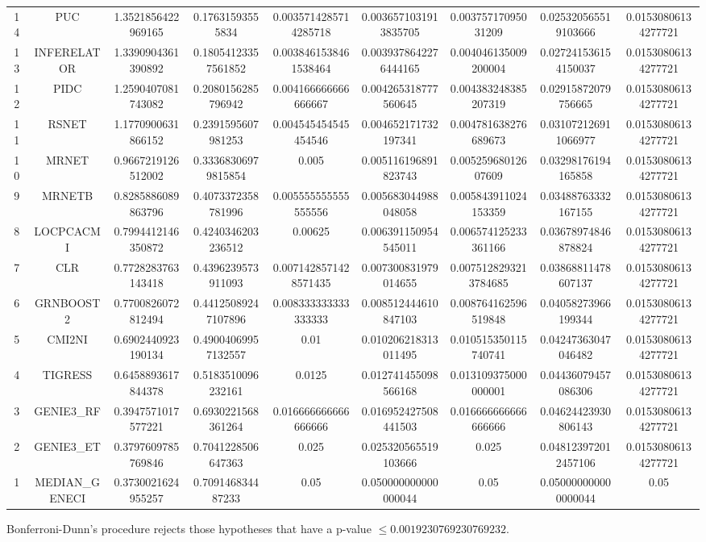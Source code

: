 \documentclass[a4paper,10pt]{article}
\begin{document}
\begin{landscape}
\begin{table}[!htp]
\begin{tabular}{ccccccccc}
14&PUC&1.3521856422969165&0.17631593555834&0.0035714285714285718&0.0036571031913835705&0.00375717095031209&0.025320565519103666&0.01530806134277721\\
13&INFERELATOR&1.3390904361390892&0.18054123357561852&0.0038461538461538464&0.0039378642276444165&0.004046135009200004&0.027241536154150037&0.01530806134277721\\
12&PIDC&1.2590407081743082&0.2080156285796942&0.004166666666666667&0.004265318777560645&0.004383248385207319&0.02915872079756665&0.01530806134277721\\
11&RSNET&1.1770900631866152&0.2391595607981253&0.004545454545454546&0.004652171732197341&0.004781638276689673&0.031072126911066977&0.01530806134277721\\
10&MRNET&0.9667219126512002&0.33368306979815854&0.005&0.005116196891823743&0.00525968012607609&0.03298176194165858&0.01530806134277721\\
9&MRNETB&0.8285886089863796&0.4073372358781996&0.005555555555555556&0.005683044988048058&0.005843911024153359&0.03488763332167155&0.01530806134277721\\
8&LOCPCACMI&0.7994412146350872&0.4240346203236512&0.00625&0.006391150954545011&0.006574125233361166&0.03678974846878824&0.01530806134277721\\
7&CLR&0.7728283763143418&0.4396239573911093&0.0071428571428571435&0.007300831979014655&0.0075128293213784685&0.03868811478607137&0.01530806134277721\\
6&GRNBOOST2&0.7700826072812494&0.44125089247107896&0.008333333333333333&0.008512444610847103&0.008764162596519848&0.04058273966199344&0.01530806134277721\\
5&CMI2NI&0.6902440923190134&0.49004069957132557&0.01&0.010206218313011495&0.010515350115740741&0.04247363047046482&0.01530806134277721\\
4&TIGRESS&0.6458893617844378&0.5183510096232161&0.0125&0.012741455098566168&0.013109375000000001&0.04436079457086306&0.01530806134277721\\
3&GENIE3_RF&0.3947571017577221&0.6930221568361264&0.016666666666666666&0.016952427508441503&0.016666666666666666&0.04624423930806143&0.01530806134277721\\
2&GENIE3_ET&0.3797609785769846&0.7041228506647363&0.025&0.025320565519103666&0.025&0.048123972012457106&0.01530806134277721\\
1&MEDIAN_GENECI&0.3730021624955257&0.709146834487233&0.05&0.050000000000000044&0.05&0.050000000000000044&0.05\\
\hline
\end{tabular}
\end{table}
Bonferroni-Dunn's procedure rejects those hypotheses that have a p-value $\le0.0019230769230769232$.



\end{landscape}
\end{document}
